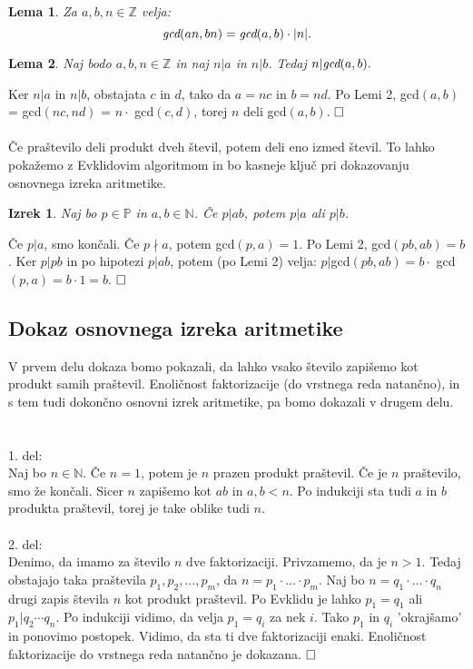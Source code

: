 \documentclass[a4paper,12pt]{article}
\def\qed{$\hfill\Box$}   %
\newtheorem{izrek}{Izrek}
\newtheorem{lema}{Lema}
\begin{document}
\begin{lema}
	Za $a,b,n \in \mathbb{Z}$ velja:
	$$\emph{gcd}(an,bn) = \emph{gcd}(a,b)\cdot|n|.$$
\end{lema}

\begin{lema}
	Naj bodo $a,b,n \in \mathbb{Z}$ in naj $n|a$ in $n|b$. Tedaj $n|\emph{gcd}(a,b).$
\end{lema}

	Ker $n|a$ in $n|b$, obstajata $c$ in $d$, tako da $a=nc$ in $b=nd$. Po Lemi 2, gcd$(a, b)$ = gcd$(nc, nd)$ = $n \cdot$ gcd$(c, d)$, torej $n$ deli gcd$(a, b)$.
\qed
\\
\\
Če praštevilo deli produkt dveh števil, potem deli eno izmed števil. To lahko pokažemo z Evklidovim algoritmom in bo kasneje ključ pri dokazovanju osnovnega
izreka aritmetike.
	
\begin{izrek}
	Naj bo $p \in \mathbb{P}$ in $a,b \in \mathbb{N}$. Če $p|ab$, potem $p|a$ ali $p|b$.
\end{izrek}

	Če $p|a$, smo končali. Če $p\nmid a$, potem gcd$(p, a)=1$. Po Lemi 2,
	gcd$(pb, ab) = b$. Ker $p|pb$ in po hipotezi $p|ab$, potem (po Lemi 2) velja:
	$p|$gcd$(pb, ab) = b\cdot$ gcd$(p, a) = b \cdot 1 = b$.
\qed

\subsection{Dokaz osnovnega izreka aritmetike}

V prvem delu dokaza bomo pokazali, da lahko vsako število zapišemo kot produkt
samih praštevil. Enoličnost faktorizacije (do vrstnega reda natančno), in s tem tudi dokončno osnovni
izrek aritmetike, pa bomo dokazali v drugem delu.
\\
\\
\\
1. del:
\\
Naj bo $n \in \mathbb{N}$. Če $n = 1$, potem je $n$ prazen produkt praštevil. Če je $n$ praštevilo, smo že končali. Sicer $n$ zapišemo kot $ab$ in $a, b < n$. Po
indukciji sta tudi $a$ in $b$ produkta praštevil, torej je take oblike tudi $n$.
\\	
\\
2. del:
\\
Denimo, da imamo za število $n$ dve faktorizaciji. Privzamemo, da je $n > 1$.
Tedaj obstajajo taka praštevila $p_1, p_2, \ldots , p_m$, da $n = p_1 \cdot \ldots \cdot p_m$. Naj bo $n = q_1 \cdot \ldots \cdot q_n$ drugi zapis števila $n$ kot produkt praštevil. Po Evklidu je lahko $p_1 = q_1$ ali $p_1|q_2\cdots q_n$. Po indukciji vidimo, da velja $p_1 = q_i$ za nek $i$. Tako $p_1$ in $q_i$ ’okrajšamo’ in ponovimo postopek. Vidimo, da sta ti dve faktorizaciji enaki.
Enoličnost faktorizacije do vrstnega reda natančno je dokazana.
\qed
\end{document}
